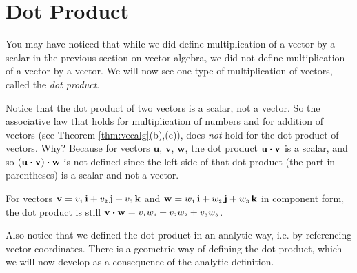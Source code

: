 \newpage
\section{Dot Product}
You may have noticed that while we did define multiplication of a vector by a scalar in the previous section on
vector algebra, we did not define multiplication of a vector by a vector. We will now see one type of
multiplication of vectors, called the \emph{dot product}.


Notice that the dot product of two vectors is a scalar, not a vector. 
So the associative law that holds for multiplication of numbers and for addition of vectors (see
Theorem \ref{thm:vecalg}(b),(e)), does \emph{not} hold for the dot product of vectors. Why? Because for vectors
$\textbf{u}$, $\textbf{v}$, $\textbf{w}$, the dot product $\textbf{u} \bm{\cdot} \textbf{v}$ is a scalar, and so
$(\textbf{u} \bm{\cdot} \textbf{v}) \bm{\cdot} \textbf{w}$ is not defined since the left side of that dot product
(the part in parentheses) is a scalar and not a vector.

For vectors $\textbf{v} = v_{\scriptscriptstyle 1}\,\textbf{i} + v_{\scriptscriptstyle 2}\,\textbf{j} + v_{\scriptscriptstyle 3}\,\textbf{k}$ and $\textbf{w} = w_{\scriptscriptstyle 1}\,\textbf{i} + w_{\scriptscriptstyle 2}\,\textbf{j} + w_{\scriptscriptstyle 3}\,\textbf{k}$ in component form, the dot product is
still $\textbf{v} \bm{\cdot} \textbf{w} = v_{\scriptscriptstyle 1}w_{\scriptscriptstyle 1} + v_{\scriptscriptstyle 2}w_{\scriptscriptstyle 2} +
v_{\scriptscriptstyle 3}w_{\scriptscriptstyle 3}$.

Also notice that we defined the dot product in an analytic way, i.e. by referencing vector coordinates. There is
a geometric way of defining the dot product, which we will now develop as a consequence of the analytic
definition.


